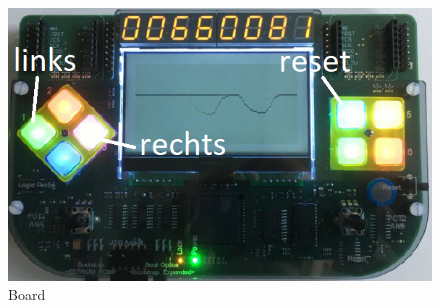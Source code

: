         \begin{figure}[H]
            \centering
            \includegraphics[scale=0.5]{img/board.png}    
            \caption{Board}
        \end{figure}